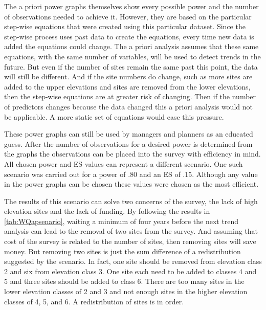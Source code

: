 The a priori power graphs themselves show every possible power and the number of observations needed to achieve it.
However, they are based on the particular step-wise equations that were created using this particular dataset.
Since the step-wise process uses past data to create the equations, every time new data is added the equations could change.
The a priori analysis assumes that these same equations, with the same number of variables, will be used to detect trends in the future.
But even if the number of sites remain the same past this point, the data will still be different.
And if the site numbers do change, such as more sites are added to the upper elevations and sites are removed from the lower elevations, then the step-wise equations are at greater risk of changing.
Then if the number of predictors changes because the data changed this a priori analysis would not be applicable.
A more static set of equations would ease this pressure.

These power graphs can still be used by managers and planners as an educated guess.
After the number of observations for a desired power is determined from the graphs the observations can be placed into the survey with efficiency in mind.
All chosen power and ES values can represent a different scenario.
One such scenario was carried out for a power of .80 and an ES of .15.
Although any value in the power graphs can be chosen these values were chosen as the most efficient. 

The results of this scenario can solve two concerns of the survey, the lack of high elevation sites and the lack of funding.
By following the results in \autoref{tab:WQapsenario}, waiting a minimum of four years before the next trend analysis can lead to the removal of two sites from the survey.
And assuming that cost of the survey is related to the number of sites, then removing sites will save money.
But removing two sites is just the sum difference of a redistribution suggested by the scenario.
In fact, one site should be removed from elevation class 2 and six from elevation class 3.
One site each need to be added to classes 4 and 5 and three sites should be added to class 6.
There are too many sites in the lower elevation classes of 2 and 3 and not enough sites in the higher elevation classes of 4, 5, and 6.
A redistribution of sites is in order.
